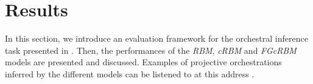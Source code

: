 \documentclass{article}
\begin{document}

%

\section{Results}
In this section, we introduce an evaluation framework for the orchestral inference task presented in . Then, the performances of the \textit{RBM}, \textit{cRBM} and \textit{FGcRBM} models are presented and discussed. Examples of projective orchestrations inferred by the different models can be listened to at this address \url{}.
\end{document}
